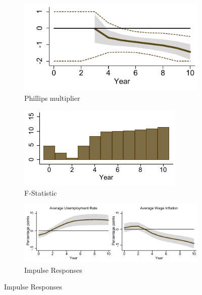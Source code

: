 \documentclass[12pt]{article}
\begin{document}
\begin{figure}[h!]
    \centering
	\caption{Phillips multiplier and IRFs}
	\label{F:Multiplie}
	\begin{subfigure}[b]{0.45\textwidth}
		\caption{Phillips multiplier}
		\label{F:Multiplier_M}
		\includegraphics[width=\textwidth]{../Output/Figures/fig_full_PMBM_LPIV10_2.pdf}	
	\end{subfigure}
	\begin{subfigure}[b]{0.45\textwidth}
		\caption{F-Statistic}
		\label{F:Multiplier_F}
		\includegraphics[width=\textwidth]{../Output/Figures/fig_full_PMBM_F_LPIV10_2.pdf}
	\end{subfigure}
	\begin{subfigure}[b]{0.9\textwidth}
		\caption{Impulse Responses}
		\label{F:Dynamics}
		\includegraphics[width=\textwidth]{../Output/Figures/fig_full_LPIVBM10_2.pdf}

\end{subfigure}
\end{figure}
\end{document}
